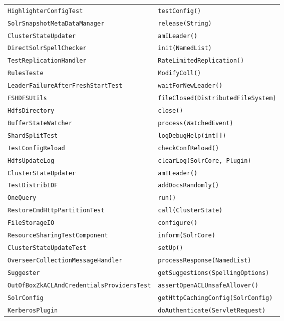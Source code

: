 \begin{center}
\begin{longtable}{ll}
\lstinline/HighlighterConfigTest/&{\lstinline/testConfig()/}\\
\lstinline/SolrSnapshotMetaDataManager/&{\lstinline/release(String)/}\\
\lstinline/ClusterStateUpdater/&{\lstinline/amILeader()/}\\
\lstinline/DirectSolrSpellChecker/&{\lstinline/init(NamedList)/}\\
\lstinline/TestReplicationHandler/&{\lstinline/RateLimitedReplication()/}\\
\lstinline/RulesTeste/&{\lstinline/ModifyColl()/}\\
\lstinline/LeaderFailureAfterFreshStartTest/&{\lstinline/waitForNewLeader()/}\\
\lstinline/FSHDFSUtils/&{\lstinline/fileClosed(DistributedFileSystem)/}\\
\lstinline/HdfsDirectory/&{\lstinline/close()/}\\
\lstinline/BufferStateWatcher/&{\lstinline/process(WatchedEvent)/}\\
\lstinline/ShardSplitTest/&{\lstinline/logDebugHelp(int[])/}\\
\lstinline/TestConfigReload/&{\lstinline/checkConfReload()/}\\
\lstinline/HdfsUpdateLog/&{\lstinline/clearLog(SolrCore, Plugin)/}\\
\lstinline/ClusterStateUpdater/&{\lstinline/amILeader()/}\\
\lstinline/TestDistribIDF/&{\lstinline/addDocsRandomly()/}\\
\lstinline/OneQuery/&{\lstinline/run()/}\\
\lstinline/RestoreCmdHttpPartitionTest/&{\lstinline/call(ClusterState)/}\\
\lstinline/FileStorageIO/&{\lstinline/configure()/}\\
\lstinline/ResourceSharingTestComponent/&{\lstinline/inform(SolrCore)/}\\
\lstinline/ClusterStateUpdateTest/&{\lstinline/setUp()/}\\
\lstinline/OverseerCollectionMessageHandler/&{\lstinline/processResponse(NamedList)/}\\
\lstinline/Suggester/&{\lstinline/getSuggestions(SpellingOptions)/}\\
\lstinline/OutOfBoxZkACLAndCredentialsProvidersTest/&{\lstinline/assertOpenACLUnsafeAllover()/}\\
\lstinline/SolrConfig/&{\lstinline/getHttpCachingConfig(SolrConfig)/}\\
\lstinline/KerberosPlugin/&{\lstinline/doAuthenticate(ServletRequest)/}\\

\end{longtable}
\end{center}
